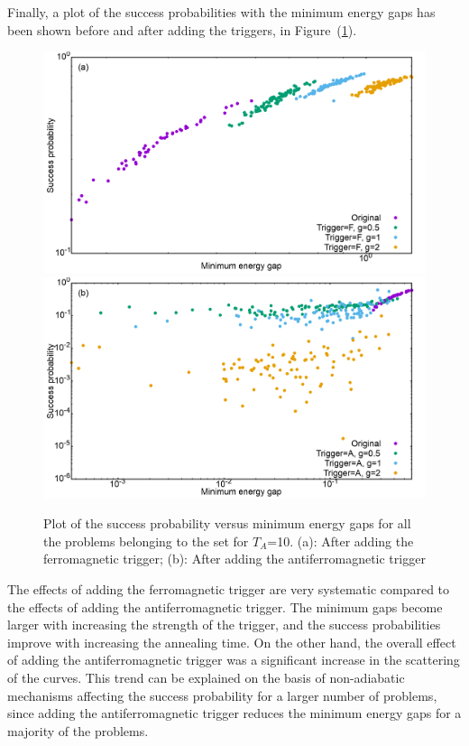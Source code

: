 \documentclass[../main.tex]{subfiles}
\begin{document}
\begin{appendices}
Finally, a plot of the success probabilities with the minimum energy gaps has been shown before and after adding the triggers, in Figure~(\ref{fig:ap5}).


\begin{figure}
\centering 
\includegraphics[scale=0.24]{SuccVsGap_F_8.png}
\includegraphics[scale=0.24]{SuccVsGap_A_8.png}
\caption{Plot of the success probability versus minimum energy gaps for all the problems belonging to the set for $T_A$=10. (a): After adding the ferromagnetic trigger; (b): After adding the antiferromagnetic trigger }
\label{fig:ap5}
\end{figure}
The effects of adding the ferromagnetic trigger are very systematic compared to the effects of adding the antiferromagnetic trigger. The minimum gaps become larger with increasing the strength of the trigger, and the success probabilities improve with increasing the annealing time. On the other hand, the overall effect of adding the antiferromagnetic trigger was a significant increase in the scattering of the curves. This trend can be explained on the basis of non-adiabatic mechanisms affecting the success probability for a larger number of problems, since adding the antiferromagnetic trigger reduces the minimum energy gaps for a majority of the problems.


\end{appendices}
\end{document}
